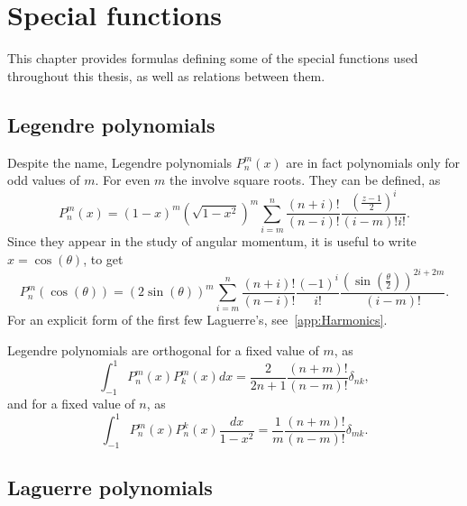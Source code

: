 \chapter{Special functions}


	This chapter provides formulas defining some of the special functions used throughout this thesis, as well as relations between them.
	
\section{Legendre polynomials}
\label{app:Legendre}

Despite the name, Legendre polynomials $P_n^m(x)$ are in fact polynomials only for odd values of $m$. For even $m$ the involve square roots. They can be defined, as
\begin{equation}
    P_n^m(x) = (1-x)^m\left(\sqrt{1-x^2}\right)^{m}\sum_{i=m}^n \frac{(n+i)!}{(n-i)!}\frac{\left(\frac{z-1}{2}\right)^i}{(i-m)!i!}.
\end{equation}
Since they appear in the study of angular momentum, it is useful to write $x=\cos(\theta)$, to get
\begin{equation}
    P_n^m(\cos(\theta)) = (2\sin(\theta))^{m}\sum_{i=m}^n \frac{(n+i)!}{(n-i)!}\frac{(-1)^i}{i!}\frac{\left(\sin(\frac{\theta}{2})\right)^{2i+2m}}{(i-m)!}.
\end{equation}
For an explicit form of the first few Laguerre's, see~\ref{app:Harmonics}.

Legendre polynomials are orthogonal for a fixed value of $m$, as
\begin{equation}
    \int_{-1}^1P_n^m(x)P_k^m(x) dx = \frac{2}{2n+1} \frac{(n+m)!}{(n-m)!} \delta_{nk},
\end{equation}
and for a fixed value of $n$, as
\begin{equation}
    \int_{-1}^1P_n^m(x)P_n^k(x) \frac{dx}{1-x^2} = \frac{1}{m} \frac{(n+m)!}{(n-m)!} \delta_{mk}.
\end{equation}

\section{Laguerre polynomials}
\label{app:Laguerre}

